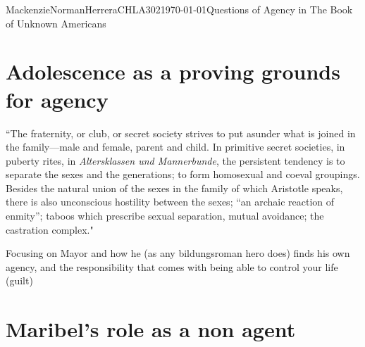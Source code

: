 \documentclass{article}
\begin{document}
\begin{mla}{Mackenzie}{Norman}{Herrera}{CHLA302}{\today}{Questions of Agency in The Book of Unknown Americans}
\section*{Adolescence as a proving grounds for agency}
``The fraternity, or club, or secret society strives to put asunder what is joined in the family—male and female, parent and child. In primitive secret societies, in puberty rites, in \textit{Altersklassen und Mannerbunde}, the persistent tendency is to separate the sexes and the generations; to form homosexual and coeval groupings. Besides the natural union of the sexes in the family of which Aristotle speaks, there is also unconscious hostility between the sexes; ``an archaic reaction of enmity''; taboos which prescribe sexual separation, mutual avoidance; the castration complex."

Focusing on Mayor and how he (as any bildungsroman hero does) finds his own agency, and the responsibility that comes with being able to control your life (guilt)




\section*{Maribel’s role as a non agent}

\printbibliography

\end{mla}
\end{document}
